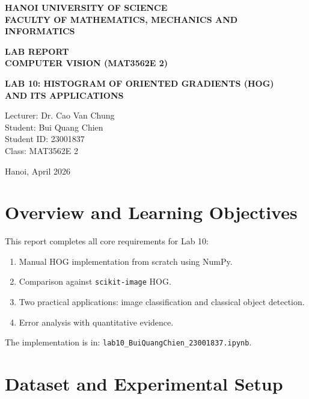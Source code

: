 \documentclass[12pt,a4paper]{article}
\begin{document}
\begin{titlepage}
    \centering
    \vspace*{2cm}

    {\LARGE\bfseries HANOI UNIVERSITY OF SCIENCE\\[0.3cm]
    FACULTY OF MATHEMATICS, MECHANICS AND INFORMATICS\\[0.8cm]}

    {\huge\bfseries LAB REPORT\\[0.4cm]
    COMPUTER VISION (MAT3562E 2)\\[0.4cm]}

    {\Large\bfseries LAB 10: HISTOGRAM OF ORIENTED GRADIENTS (HOG)\\
    AND ITS APPLICATIONS\\[1.2cm]}

    \begin{flushleft}
    {\large
    Lecturer: Dr. Cao Van Chung\\
    Student: Bui Quang Chien\\
    Student ID: 23001837\\
    Class: MAT3562E 2
    }
    \end{flushleft}

    \vfill
    {\large Hanoi, April 2026}
\end{titlepage}

\tableofcontents
\newpage

\section{Overview and Learning Objectives}
This report completes all core requirements for Lab 10:
\begin{enumerate}
    \item Manual HOG implementation from scratch using NumPy.
    \item Comparison against \texttt{scikit-image} HOG.
    \item Two practical applications:
    image classification and classical object detection.
    \item Error analysis with quantitative evidence.
\end{enumerate}

The implementation is in:
\texttt{lab10\_BuiQuangChien\_23001837.ipynb}.

\section{Dataset and Experimental Setup}
\end{document}
